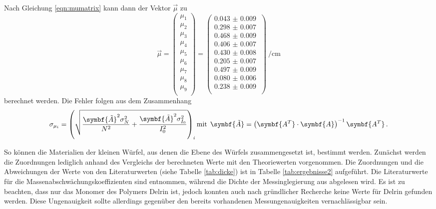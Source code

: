 Nach Gleichung \eqref{eqn:mumatrix} kann dann der Vektor $\vec{\mu}$ zu
\begin{equation*}
  \vec{\mu}=
  \left(
      \begin{array}{r}
        \mu_1 \\
        \mu_2 \\
        \mu_3 \\
        \mu_4 \\
        \mu_5 \\
        \mu_6 \\
        \mu_7 \\
        \mu_8 \\
        \mu_9 \\
      \end{array}
      \right)=
  \left(
      \begin{array}{r}
        \SI{0.043(9)}{} \\
        \SI{0.298(7)}{} \\
        \SI{0.468(9)}{} \\
        \SI{0.406(7)}{} \\
        \SI{0.430(8)}{} \\
        \SI{0.205(7)}{} \\
        \SI{0.497(9)}{} \\
        \SI{0.080(6)}{} \\
        \SI{0.238(9)}{} \\
      \end{array}
      \right)
      \SI{}{\per\centi\meter}
\end{equation*}
berechnet werden. Die Fehler folgen aus dem Zusammenhang
\begin{equation}
  \sigma_{\mu_i} = \left(\sqrt{\frac{\symbf{\tilde{A}}^2 \sigma_{N}^2}{N^2} + \frac{\symbf{\tilde{A}}^{2} \sigma_{I_{0}}^2}{I_{0}^2}}\right)_i \\
  \text{mit}\:\: \symbf{\tilde{A}} = \left(\symbf{A^T} \cdot \symbf{A}\right)^{-1} \symbf{A^T}\,.
\end{equation}

So können die Materialien der kleinen Würfel, aus denen die Ebene des Würfels zusammengesetzt ist, bestimmt werden. Zunächst werden die Zuordnungen lediglich anhand des Vergleichs der berechneten Werte mit den Theoriewerten vorgenommen. Die
Zuordnungen und die Abweichungen der Werte von den Literaturwerten (siehe Tabelle \ref{tab:dicke}) ist in Tabelle \ref{tab:ergebnisse2} aufgeführt.
Die Literaturwerte für die Massenabschwächungskoeffizienten sind \cite{datenbank} entnommen, während die Dichte der Messinglegierung aus \cite{messing} abgelesen wird.
Es ist zu beachten, dass  nur das Monomer des Polymers Delrin ist, jedoch konnten auch nach gründlicher Recherche keine Werte für Delrin gefunden werden. Diese Ungenauigkeit sollte allerdings gegenüber den bereits vorhandenen Messungenauigkeiten vernachlässigbar sein.


